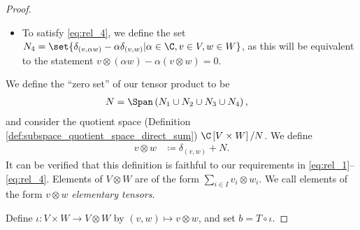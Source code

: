 \begin{proof}
\begin{itemize}
    \item To satisfy \eqref{eq:rel_4}, we define the set $N_4 = \set{\delta_{\left(  v,\alpha w \right)} - \alpha \delta_{\left( v,w \right)} | \alpha\in\C,v\in V,w\in W}$, as this will be equivalent to the statement $v\otimes \left( \alpha w \right) - \alpha \left( v\otimes w \right) = 0$.
  \end{itemize}
  We define the ``zero set'' of our tensor product to be
  \begin{align*}
    N &= \Span\left( N_1 \cup N_2\cup N_3\cup N_4 \right),
  \end{align*}
  and consider the quotient space (Definition \ref{def:subspace_quotient_space_direct_sum}) $\C\left[ V\times W \right]/N$. We define
  \begin{align*}
    v\otimes w &\coloneq \delta_{(v,w)} + N.
  \end{align*}
  It can be verified that this definition is faithful to our requirements in \eqref{eq:rel_1}--\eqref{eq:rel_4}. Elements of $V\otimes W$ are of the form $\sum_{i\in I}v_i \otimes w_i$. We call elements of the form $v\otimes w$ \textit{elementary tensors}.\newline

  Define $\iota\colon V\times W \rightarrow V\otimes W$ by $\left( v,w \right) \mapsto v\otimes w$, and set $b = T\circ \iota$.\newline


\end{proof}
